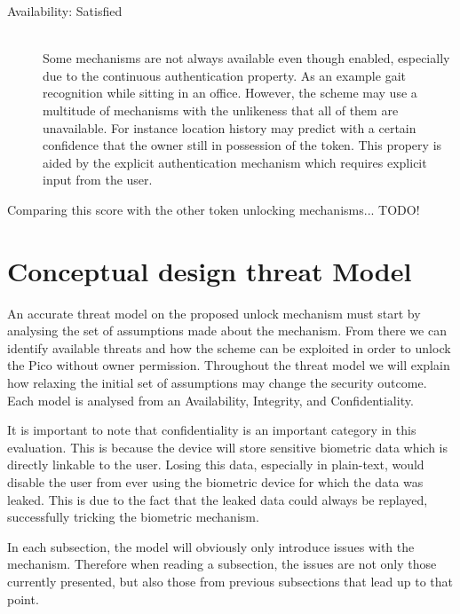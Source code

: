 \begin{description}
  \item[Availability: Satisfied] \hfill \\
  Some mechanisms are not always available even though enabled, especially due to the continuous authentication property. As an example gait recognition while sitting in an office. However, the scheme may use a multitude of mechanisms with the unlikeness that all of them are unavailable. For instance location history may predict with a certain confidence that the owner still in possession of the token. This propery is aided by the explicit authentication mechanism which requires explicit input from the user.
  
\end{description}

Comparing this score with the other token unlocking mechanisms... TODO!




\section{Conceptual design threat Model}
An accurate threat model on the proposed unlock mechanism must start by analysing the set of assumptions made about the mechanism. From there we can identify available threats and how the scheme can be exploited in order to unlock the Pico without owner permission. Throughout the threat model we will explain how relaxing the initial set of assumptions may change the security outcome. Each model is analysed from an Availability, Integrity, and Confidentiality.

It is important to note that confidentiality is an important category in this evaluation. This is because the device will store sensitive biometric data which is directly linkable to the user. Losing this data, especially in plain-text, would disable the user from ever using the biometric device for which the data was leaked. This is due to the fact that the leaked data could always be replayed, successfully tricking the biometric mechanism.

In each subsection, the model will obviously only introduce issues with the mechanism. Therefore when reading a subsection, the issues are not only those currently presented, but also those from previous subsections that lead up to that point.

